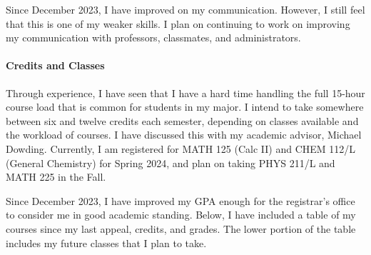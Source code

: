 \documentclass[12pt]{article}
\begin{document}
Since December 2023, I have improved on my communication. 
However, I still feel that this is one of my weaker skills.
I plan on continuing to work on improving my communication with professors,
classmates, and administrators.

\paragraph{Credits and Classes}
Through experience, I have seen that I have a hard time handling the full 
15-hour course load that is common for students in my major.
I intend to take somewhere between six and twelve credits each semester, depending
on classes available and the workload of courses.
I have discussed this with my academic advisor, Michael Dowding.
Currently, I am registered for MATH 125 (Calc II) and CHEM 112/L 
(General Chemistry) for Spring 2024, and plan on taking PHYS 211/L and MATH 225
in the Fall.

Since December 2023, I have improved my GPA enough for the registrar's office to
consider me in good academic standing.
Below, I have included a table of my courses since my last appeal, credits, and
grades.
The lower portion of the table includes my future classes that I plan to take.
\end{document}
